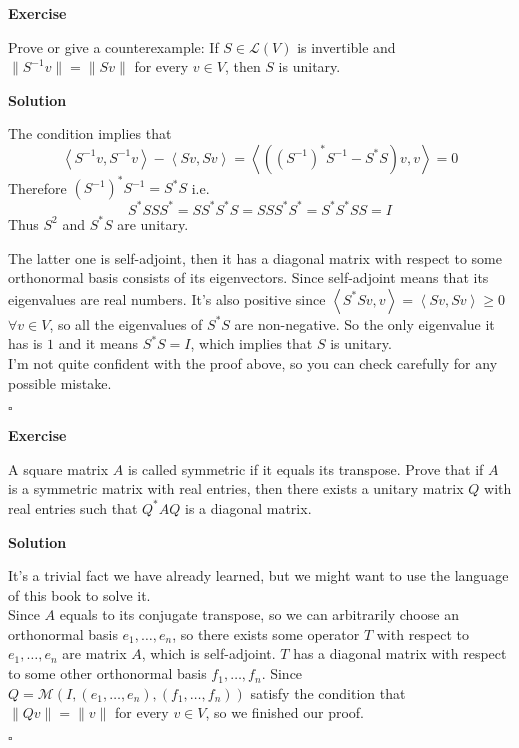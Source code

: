 \documentclass{article}
\newenvironment{exercise}{%
{\textbf{Exercise\\}
    }
}{
}
\newenvironment{solution}{%
{
    \textbf{Solution\\}
    }
}{
  \hfill $\square$ 
  \par\bigskip 
}
\newcommand{\parameter}[1]{\left(#1\right)}
\begin{document}
\begin{CJK}{UTF8}{gkai}
\begin{exercise}
    Prove or give a counterexample: If $S \in \mathcal{L}(V)$ is invertible and $\|S^{-1}v\| = \|Sv\|$ for every $v \in V$, then $S$ is unitary.
\end{exercise}

\begin{solution}
    The condition implies that 
    \[\left<S^{-1}v,S^{-1}v\right> - \left<Sv,Sv\right>= \left<\parameter{(S^{-1})^\ast S^{-1} - S^\ast S} v,v\right> = 0\]
    Therefore $(S^{-1})^\ast S^{-1} = S^\ast S$ i.e. 
    \[S^\ast S S S^\ast  = S S^\ast S^\ast S = S S S^\ast S^\ast = S^\ast S^\ast S S =  I\]
    Thus $S^2$ and $S^\ast S$ are unitary.

    The latter one is self-adjoint, then it has a diagonal matrix with respect to some orthonormal basis consists of its eigenvectors. Since self-adjoint means that its eigenvalues are real numbers. It's also positive since $\left<S^\ast Sv,v\right> = \left<Sv,Sv\right> \geq 0$ $\forall v \in V$, so all the eigenvalues of $S^\ast S$ are non-negative. So the only eigenvalue it has is $1$ and it means $S^\ast S = I$, which implies that $S$ is unitary.\\

    I'm not quite confident with the proof above, so you can check carefully for any possible mistake.
\end{solution}

\begin{exercise}
    A square matrix $A$ is called symmetric if it equals its transpose. Prove that if $A$ is a symmetric matrix with real entries, then there exists a unitary matrix $Q$ with real entries such that $Q^\ast AQ$ is a diagonal matrix.
\end{exercise}

\begin{solution}
    It's a trivial fact we have already learned, but we might want to use the language of this book to solve it.\\

    Since $A$ equals to its conjugate transpose, so we can arbitrarily choose an orthonormal basis $e_1,\ldots,e_n$, so there exists some operator $T$ with respect to $e_1,\ldots,e_n$ are matrix $A$, which is self-adjoint. $T$ has a diagonal matrix with respect to some other orthonormal basis $f_1,\ldots,f_n$. Since $Q = \mathcal{M}(I,(e_1,\ldots,e_n),(f_1,\ldots,f_n))$ satisfy the condition that $\|Qv\| = \|v\|$ for every $v \in V$, so we finished our proof.
\end{solution}


\end{CJK}
\end{document}
